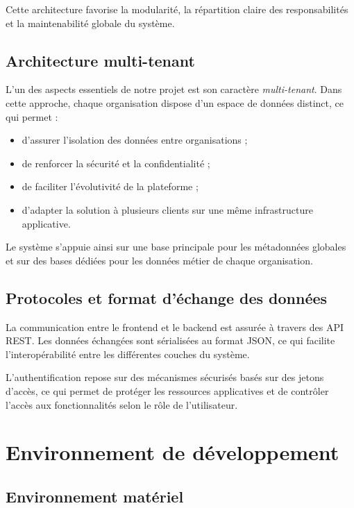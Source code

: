 \documentclass[12pt,a4paper]{report}
\begin{document}
Cette architecture favorise la modularité, la répartition claire des responsabilités et la maintenabilité globale du système.

\subsection{Architecture multi-tenant}

L’un des aspects essentiels de notre projet est son caractère \textit{multi-tenant}. Dans cette approche, chaque organisation dispose d’un espace de données distinct, ce qui permet :

\begin{itemize}
    \item d’assurer l’isolation des données entre organisations ;
    \item de renforcer la sécurité et la confidentialité ;
    \item de faciliter l’évolutivité de la plateforme ;
    \item d’adapter la solution à plusieurs clients sur une même infrastructure applicative.
\end{itemize}

Le système s’appuie ainsi sur une base principale pour les métadonnées globales et sur des bases dédiées pour les données métier de chaque organisation.

\subsection{Protocoles et format d’échange des données}

La communication entre le frontend et le backend est assurée à travers des API REST. Les données échangées sont sérialisées au format JSON, ce qui facilite l’interopérabilité entre les différentes couches du système.

L’authentification repose sur des mécanismes sécurisés basés sur des jetons d’accès, ce qui permet de protéger les ressources applicatives et de contrôler l’accès aux fonctionnalités selon le rôle de l’utilisateur.

\section{Environnement de développement}

\subsection{Environnement matériel}
\end{document}
